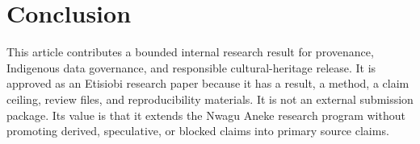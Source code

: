 \documentclass[sigconf,nonacm]{acmart}
\begin{document}
\section{Conclusion}
This article contributes a bounded internal research result for provenance, Indigenous data governance, and responsible cultural-heritage release. It is
approved as an Etisiobi research paper because it has a result, a method, a
claim ceiling, review files, and reproducibility materials. It is not an
external submission package. Its value is that it extends the Nwagu Aneke
research program without promoting derived, speculative, or blocked claims into
primary source claims.



\end{document}
